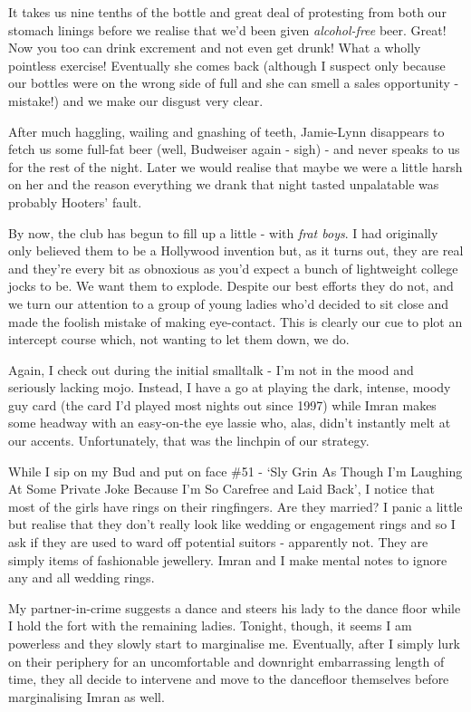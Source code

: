 \documentclass[a5paper,titlepage,11pt]{book}
\begin{document}
It takes us nine tenths of the bottle and great deal of protesting from both our stomach linings before we realise that we'd been given \emph{alcohol-free} beer.  Great!  Now you too can drink excrement and not even get drunk!  What a wholly pointless exercise!  Eventually she comes back (although I suspect only because our bottles were on the wrong side of full and she can smell a sales opportunity - mistake!) and we make our disgust very clear.

After much haggling, wailing and gnashing of teeth, Jamie-Lynn disappears to fetch us some full-fat beer (well, Budweiser again - sigh) - and never speaks to us for the rest of the night.  Later we would realise that maybe we were a little harsh on her and the reason everything we drank that night tasted unpalatable was probably Hooters' fault.

By now, the club has begun to fill up a little - with \emph{frat boys}.  I had originally only believed them to be a Hollywood invention but, as it turns out, they are real and they're every bit as obnoxious as you'd expect a bunch of lightweight college jocks to be.  We want them to explode.  Despite our best efforts they do not, and we turn our attention to a group of young ladies who'd decided to sit close and made the foolish mistake of making eye-contact.  This is clearly our cue to plot an intercept course which, not wanting to let them down, we do.

Again, I check out during the initial smalltalk - I'm not in the mood and seriously lacking mojo.  Instead, I have a go at playing the dark, intense, moody guy card (the card I'd played most nights out since 1997) while Imran makes some headway with an easy-on-the eye lassie who, alas, didn't instantly melt at our accents.  Unfortunately, that was the linchpin of our strategy.

While I sip on my Bud and put on face \#51 - `Sly Grin As Though I'm Laughing At Some Private Joke Because I'm So Carefree and Laid Back', I notice that most of the girls have rings on their ringfingers.  Are they married?  I panic a little but realise that they don't really look like wedding or engagement rings and so I ask if they are used to ward off potential suitors - apparently not.  They are simply items of fashionable jewellery.  Imran and I make mental notes to ignore any and all wedding rings.

My partner-in-crime suggests a dance and steers his lady to the dance floor while I hold the fort with the remaining ladies.  Tonight, though, it seems I am powerless and they slowly start to marginalise me.  Eventually, after I simply lurk on their periphery for an uncomfortable and downright embarrassing length of time, they all decide to intervene and move to the dancefloor themselves before marginalising Imran as well.
\end{document}
